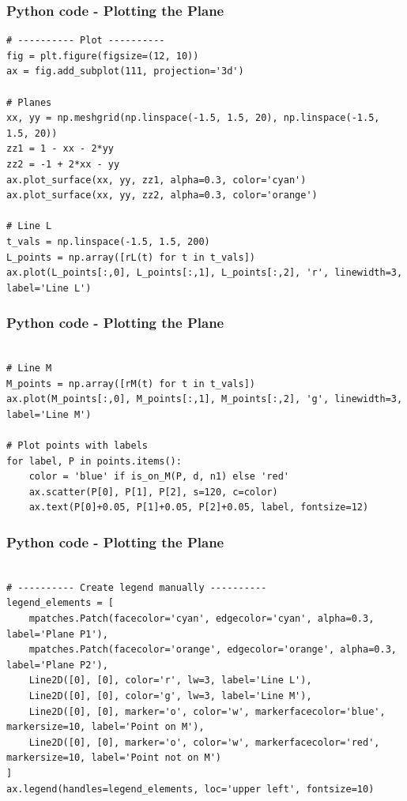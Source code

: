 \documentclass{beamer}
\begin{document}
\begin{frame}[fragile]                            
\frametitle{Python code - Plotting the Plane}                
\begin{lstlisting}
# ---------- Plot ----------
fig = plt.figure(figsize=(12, 10))
ax = fig.add_subplot(111, projection='3d')

# Planes
xx, yy = np.meshgrid(np.linspace(-1.5, 1.5, 20), np.linspace(-1.5, 1.5, 20))
zz1 = 1 - xx - 2*yy
zz2 = -1 + 2*xx - yy
ax.plot_surface(xx, yy, zz1, alpha=0.3, color='cyan')
ax.plot_surface(xx, yy, zz2, alpha=0.3, color='orange')

# Line L
t_vals = np.linspace(-1.5, 1.5, 200)
L_points = np.array([rL(t) for t in t_vals])
ax.plot(L_points[:,0], L_points[:,1], L_points[:,2], 'r', linewidth=3, label='Line L')
\end{lstlisting}
\end{frame}

\begin{frame}[fragile]                            
\frametitle{Python code - Plotting the Plane}                
\begin{lstlisting}

# Line M
M_points = np.array([rM(t) for t in t_vals])
ax.plot(M_points[:,0], M_points[:,1], M_points[:,2], 'g', linewidth=3, label='Line M')

# Plot points with labels
for label, P in points.items():
    color = 'blue' if is_on_M(P, d, n1) else 'red'
    ax.scatter(P[0], P[1], P[2], s=120, c=color)
    ax.text(P[0]+0.05, P[1]+0.05, P[2]+0.05, label, fontsize=12)
\end{lstlisting}
\end{frame}

\begin{frame}[fragile]                            
\frametitle{Python code - Plotting the Plane}                
\begin{lstlisting}

# ---------- Create legend manually ----------
legend_elements = [
    mpatches.Patch(facecolor='cyan', edgecolor='cyan', alpha=0.3, label='Plane P1'),
    mpatches.Patch(facecolor='orange', edgecolor='orange', alpha=0.3, label='Plane P2'),
    Line2D([0], [0], color='r', lw=3, label='Line L'),
    Line2D([0], [0], color='g', lw=3, label='Line M'),
    Line2D([0], [0], marker='o', color='w', markerfacecolor='blue', markersize=10, label='Point on M'),
    Line2D([0], [0], marker='o', color='w', markerfacecolor='red', markersize=10, label='Point not on M')
]
ax.legend(handles=legend_elements, loc='upper left', fontsize=10)
\end{lstlisting}
\end{frame}
\end{document}
